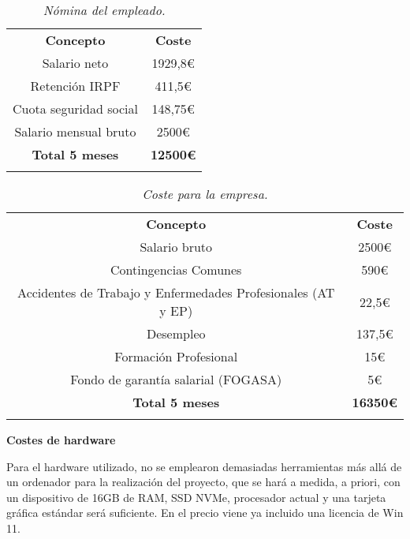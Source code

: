 \begin{table}[H]
    \centering
    \begin{tabular}{| c | c |}
        \Xhline{2\arrayrulewidth}
        \textbf{Concepto} & \textbf{Coste} \\ \Xhline{2\arrayrulewidth}
        Salario neto & 1929,8€ \\ \hline
        Retención IRPF & 411,5€ \\ \hline
        Cuota seguridad social & 148,75€ \\ \hline
        Salario mensual bruto & 2500€ \\ \hline
        \Xhline{2\arrayrulewidth}
        \textbf{Total 5 meses} & \textbf{12500€} \\ \Xhline{2\arrayrulewidth}
    \end{tabular}
    \caption{\textit{Nómina del empleado.}}
\end{table}

\begin{table}[H]
    \centering
    \begin{tabular}{| c | c |}
        \Xhline{2\arrayrulewidth}
        \textbf{Concepto} & \textbf{Coste} \\ \Xhline{2\arrayrulewidth}
        Salario bruto & 2500€ \\ \hline
        Contingencias Comunes & 590€ \\ \hline
        Accidentes de Trabajo y Enfermedades Profesionales (AT y EP) & 22,5€ \\ \hline
        Desempleo & 137,5€ \\ \hline
        Formación Profesional & 15€ \\ \hline
        Fondo de garantía salarial (FOGASA) & 5€ \\ \hline
        \Xhline{2\arrayrulewidth}
        \textbf{Total 5 meses} & \textbf{16350€} \\ \Xhline{2\arrayrulewidth}
    \end{tabular}
    \caption{\textit{Coste para la empresa.}}
\end{table}

\textbf{Costes de hardware}

Para el hardware utilizado, no se emplearon demasiadas herramientas más allá de un ordenador para la realización del proyecto,
que se hará a medida, a priori, con un dispositivo de 16GB de RAM, SSD NVMe, procesador actual y una tarjeta gráfica estándar
será suficiente.
En el precio viene ya incluido una licencia de Win 11.

